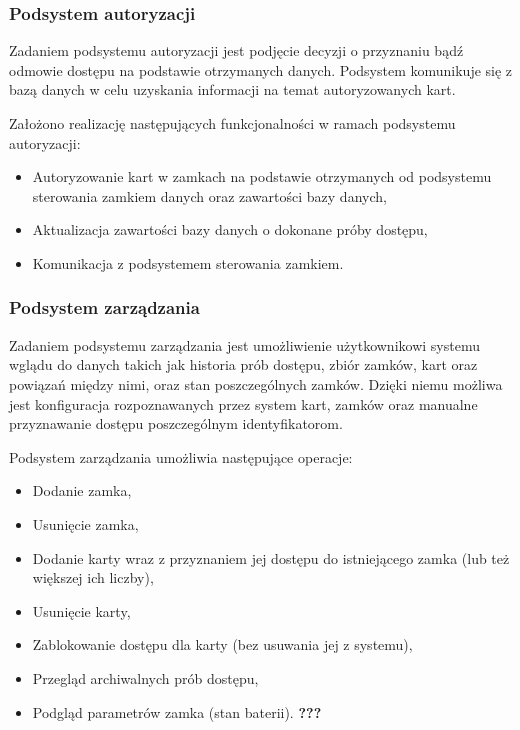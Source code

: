                        \subsubsection{Podsystem autoryzacji}
                                Zadaniem podsystemu autoryzacji jest podjęcie decyzji o przyznaniu bądź odmowie dostępu na podstawie otrzymanych danych. Podsystem komunikuje się z bazą danych w celu uzyskania informacji na temat autoryzowanych kart.

                                Założono realizację następujących funkcjonalności w ramach podsystemu autoryzacji:
                                \begin{itemize}
                                        \item Autoryzowanie kart w zamkach na podstawie otrzymanych od podsystemu sterowania zamkiem danych oraz zawartości bazy danych,
                                        \item Aktualizacja zawartości bazy danych o dokonane próby dostępu,
                                        \item Komunikacja z podsystemem sterowania zamkiem.
                                \end{itemize}

                        \subsubsection{Podsystem zarządzania}
                                Zadaniem podsystemu zarządzania jest umożliwienie użytkownikowi systemu wglądu do danych takich jak historia prób dostępu, zbiór zamków, kart oraz powiązań między nimi, oraz stan poszczególnych zamków. Dzięki niemu możliwa jest konfiguracja rozpoznawanych przez system kart, zamków oraz manualne przyznawanie dostępu poszczególnym identyfikatorom.

                                Podsystem zarządzania umożliwia następujące operacje:
                                \begin{itemize}
                                        \item Dodanie zamka,
                                        \item Usunięcie zamka,
                                        \item Dodanie karty wraz z przyznaniem jej dostępu do istniejącego zamka (lub też większej ich liczby),
                                        \item Usunięcie karty,
                                        \item Zablokowanie dostępu dla karty (bez usuwania jej z systemu),
                                        \item Przegląd archiwalnych prób dostępu,
                                        \item Podgląd parametrów zamka (stan baterii). \textbf{???}
                                \end{itemize}

